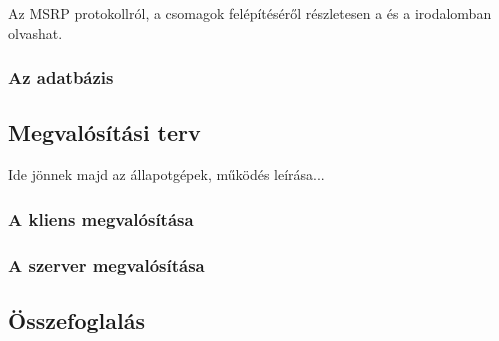 \bigskip

Az MSRP protokollról, a csomagok felépítéséről részletesen a \cite{rfc4975} és a \cite{rfc4976} irodalomban olvashat.

\subsubsection{Az adatbázis}
\label{sec:adatb}

\subsection{Megvalósítási terv}
\label{sec:megvalositas}

Ide jönnek majd az állapotgépek, működés leírása...

\subsubsection{A kliens megvalósítása}
\label{sec:kliensmegvalositas}

\subsubsection{A szerver megvalósítása}
\label{sec:szervermegvalositas}


\subsection{Összefoglalás}

